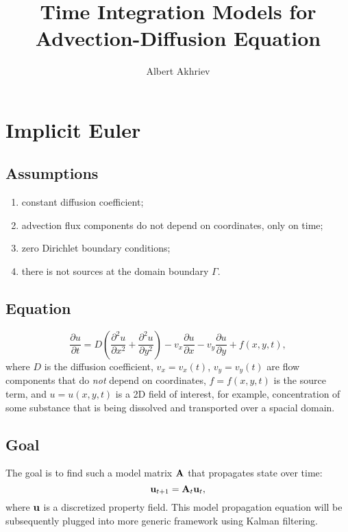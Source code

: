 \documentclass[]{article}
\title{Time Integration Models for Advection-Diffusion Equation}
\author{Albert Akhriev}
\begin{document}
\maketitle


\newcommand{\myu}[3]{u_{{#1},{#2}}^{#3}}
\newcommand{\mydt}{{\Delta{t}}}
\newcommand{\mydx}{{\Delta{x}}}
\newcommand{\mydy}{{\Delta{y}}}
\newcommand{\TODO}[1]{({\bf{\color{red}{TODO:}}}\,\,\,{\footnotesize\it{#1}})}

\section{Implicit Euler}

\subsection{Assumptions}
\begin{enumerate}
\item constant diffusion coefficient;
\item advection flux components do not depend on coordinates, only on time;
\item zero Dirichlet boundary conditions;
\item there is not sources at the domain boundary $\Gamma$.
\end{enumerate}

\subsection{Equation}
\begin{equation}
\frac{\partial u}{\partial t} =
D \left(\frac{\partial^2 u}{\partial x^2} + \frac{\partial^2 u}{\partial y^2}\right)
- v_x \frac{\partial u}{\partial x}
- v_y \frac{\partial u}{\partial y} + f(x,y,t),
\end{equation}
where $D$ is the diffusion coefficient, $v_x = v_x(t)$, $v_y = v_y(t)$ are flow components that do \textit{not} depend on coordinates, $f = f(x,y,t)$ is the source term, and $u = u(x,y,t)$ is a 2D field of interest, for example, concentration of some substance that is being dissolved and transported over a spacial domain.

\subsection{Goal}
The goal is to find such a model matrix ${\bf A}$ that propagates state over time:
\begin{equation}
{\bf u}_{t+1} = {\bf A}_t {\bf u}_t,
\label{eq:model-mat-A}
\end{equation}
where ${\bf u}$ is a discretized property field. This model propagation equation will be subsequently plugged into more generic framework using Kalman filtering.
\end{document}
